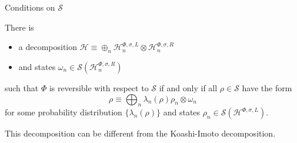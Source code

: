 \documentclass[mathserif]{beamer}
\newcommand{\<}{\langle}
\renewcommand{\>}{\rangle}
\newcommand{\Tr}{\operatorname{Tr}\,}
\newcommand{\Se}{\mathcal S}
\newcommand{\Ha}{\mathcal H}
\begin{document}
\begin{frame}{Conditions on $\Se$}

There is 
\medskip
\begin{itemize}
\item a decomposition $\Ha\equiv \oplus_n
\Ha_n^{\Phi,\sigma,L}\otimes\Ha_n^{\Phi,\sigma,R}$
\item and states $\omega_n\in \Se(\Ha_n^{\Phi,\sigma,R})$ 

\end{itemize}
\medskip

such that $\Phi$ is reversible with respect to $\Se$ if and only if all $\rho\in \Se$ have
the form
\[
\rho\equiv \bigoplus_n \lambda_n(\rho)\rho_n\otimes \omega_n
\]
for some probability distribution $\{\lambda_n(\rho)\}$ and states $\rho_n\in \Se(\Ha^{\Phi,\sigma,L})$.

\bigskip

This decomposition can be different from the Koashi-Imoto decomposition.

\end{frame}

%
%
%
%
%
%
%
%
%
%
%
%
\end{document}
